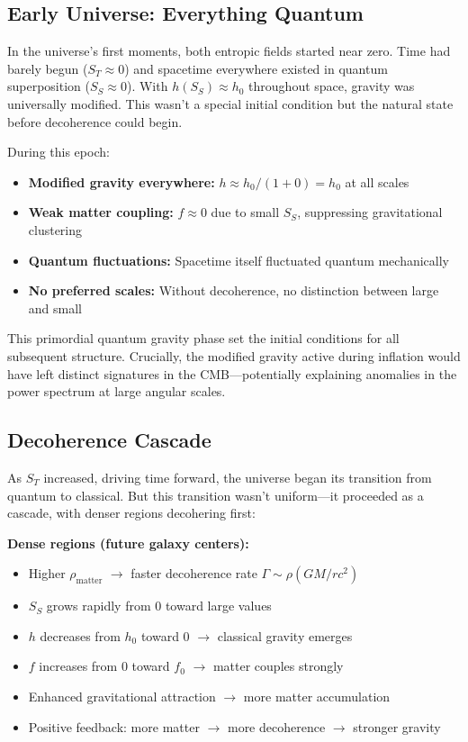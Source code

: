 \documentclass[12pt]{article}
\begin{document}
\subsection{Early Universe: Everything Quantum}

In the universe's first moments, both entropic fields started near zero. Time had barely begun ($S_T \approx 0$) and spacetime everywhere existed in quantum superposition ($S_S \approx 0$). With $h(S_S) \approx h_0$ throughout space, gravity was universally modified. This wasn't a special initial condition but the natural state before decoherence could begin.

During this epoch:
\begin{itemize}
    \item \textbf{Modified gravity everywhere:} $h \approx h_0/(1 + 0) = h_0$ at all scales
    \item \textbf{Weak matter coupling:} $f \approx 0$ due to small $S_S$, suppressing gravitational clustering
    \item \textbf{Quantum fluctuations:} Spacetime itself fluctuated quantum mechanically
    \item \textbf{No preferred scales:} Without decoherence, no distinction between large and small
\end{itemize}
This primordial quantum gravity phase set the initial conditions for all subsequent structure. Crucially, the modified gravity active during inflation would have left distinct signatures in the CMB---potentially explaining anomalies in the power spectrum at large angular scales.

\subsection{Decoherence Cascade}

As $S_T$ increased, driving time forward, the universe began its transition from quantum to classical. But this transition wasn't uniform---it proceeded as a cascade, with denser regions decohering first:

\textbf{Dense regions (future galaxy centers):}
\begin{itemize}
    \item Higher $\rho_\mathrm{matter}$ $\rightarrow$ faster decoherence rate $\Gamma \sim \rho (GM/rc^2)$
    \item $S_S$ grows rapidly from $0$ toward large values
    \item $h$ decreases from $h_0$ toward $0$ $\rightarrow$ classical gravity emerges
    \item $f$ increases from $0$ toward $f_0$ $\rightarrow$ matter couples strongly
    \item Enhanced gravitational attraction $\rightarrow$ more matter accumulation
    \item Positive feedback: more matter $\rightarrow$ more decoherence $\rightarrow$ stronger gravity
\end{itemize}
\end{document}
